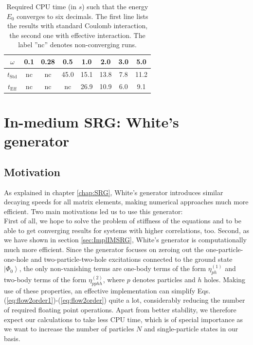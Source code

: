 \begin{table}
\begin{center}
\begin{tabular}{|c||c|c|c|c|c|c|c|}
\hline
$\omega$  &0.1 & 0.28& 0.5&1.0 &2.0 & 3.0 & 5.0\\
\hline
$t_{\text{Std}}$  &nc & nc&45.0 &15.1 &13.8 & 7.8 & 11.2\\
$t_{\text{Eff}}$ & nc& nc& nc& 26.9& 10.9& 6.0& 9.1\\
\hline
\end{tabular}
\end{center}
\caption{Required CPU time (in $s$)  such that the energy $E_0$ converges to six decimals. The first line lists the results with standard Coulomb interaction, the second one with effective interaction. The label ''nc'' denotes non-converging runs.}
\label{tab:timeConv}
\end{table}

\section{In-medium SRG: White's generator}
\label{sec:White}
\subsection{Motivation}
As explained in chapter \ref{chap:SRG}, White's generator introduces similar decaying speeds for all matrix elements, making numerical approaches much more efficient. Two main motivations led us to use this generator:\\
First of all, we hope to solve the problem of stiffness of the equations and to be able to get converging results for systems with higher correlations, too. Second, 
 as we have shown in section \ref{sec:ImplIMSRG},
White's generator is computationally much more efficient. Since the generator focuses on zeroing out the one-particle-one-hole and two-particle-two-hole excitations connected to the ground state $\left| \Phi_0 \right\rangle$, the only non-vanishing terms are one-body terms of the form $\eta_{ph}^{(1)}$ and two-body terms of the form $\eta_{pphh}^{(2)}$, where $p$ denotes particles and $h$ holes.
Making use of these properties, an effective implementation can simplify Eqs. (\ref{eq:flow2order1})-(\ref{eq:flow2order}) quite a lot, considerably reducing the number of required floating point operations. Apart from better stability, we therefore expect our calculations to take less CPU time, which is of special importance as we want to increase the number of particles $N$ and single-particle states in our basis.

